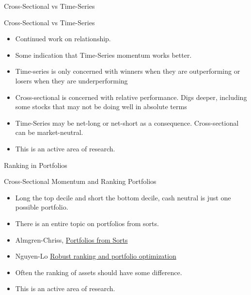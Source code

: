 \begin{frame}{Cross-Sectional vs Time-Series}
\begin{alertblock}{Cross-Sectional vs Time-Series}
\begin{itemize}
    \item Continued work on relationship.
    \item Some indication that Time-Series momentum works better. 
    \item Time-series is only concerned with winners when they are outperforming or losers when they are underperforming 
    \item Cross-sectional is concerned with relative performance. Digs deeper, including some stocks that may not be doing well in absolute terms
    \item Time-Series may be net-long or net-short as a consequence. Cross-sectional can be market-neutral.
    \item This is an active area of research.
\end{itemize}
    
\end{alertblock}
    
\end{frame}



\begin{frame}{Ranking in Portfolios}
\begin{alertblock}{Cross-Sectional Momentum and Ranking Portfolios}
\begin{itemize}
    \item Long the top decile and short the bottom decile, cash neutral is just one possible portfolio.
    \item There is an entire topic on portfolios from sorts.  
    \item Almgren-Chriss, \href{https://papers.ssrn.com/sol3/papers.cfm?abstract_id=720041}{Portfolios from Sorts}
    \item Nguyen-Lo \href{https://www.sciencedirect.com/science/article/pii/S0377221712002329?casa_token=JvNMb5IlRD4AAAAA:mucm7PNlGMnEvDQV02s8e-3h3lLqYrmbF2ET-YGWBKtah7KKMcZWvfHGakIHo-OVesjnW9bONQ4}{Robust ranking and portfolio optimization}
    \item Often the ranking of assets should have some difference.
    \item This is an active area of research.
\end{itemize}
    
\end{alertblock}
    
\end{frame}



